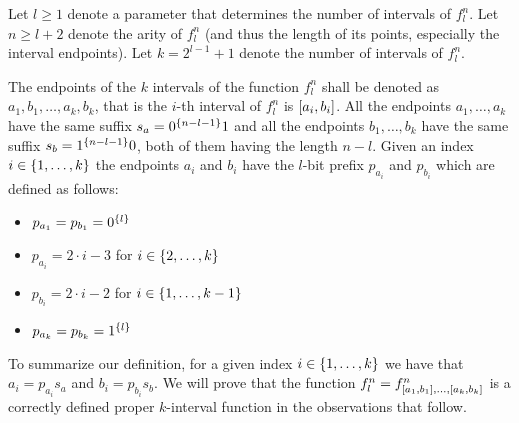 \begin{definition}
\label{def:difficultfn}

Let $l \geq 1$
denote a parameter that determines the number of intervals of $f_l^n$.
Let $n \geq l+2$
denote the arity of $f_l^n$
(and thus the length of its points,
especially the interval endpoints).
Let $k = 2^{l-1} + 1$ denote the number of intervals of $f_l^n$.


The endpoints of the $k$ intervals
of the function $f^n_l$ shall be denoted as
$a_1, b_1, \ldots, a_k, b_k$,
that is the $i$-th interval of $f^n_l$
is $[a_i, b_i]$.
All the endpoints $a_1, \ldots, a_k$
have the same suffix $s_a = 0^{\{n-l-1\}} 1$
and all the endpoints $b_1, \ldots, b_k$
have the same suffix $s_b = 1^{\{n-l-1\}} 0$,
both of them having the length $n-l$.
Given an index $i \in \{1, \ldots, k\}$
the endpoints $a_i$ and $b_i$ have the $l$-bit prefix
$p_{a_i}$ and $p_{b_i}$ which are defined as follows:
\begin{itemize}
\item $p_{a_1} = p_{b_1} = 0^{\{l\}}$
\item $p_{a_i} = 2 \cdot i - 3$ for $i \in \{2, \ldots, k\}$
\item $p_{b_i} = 2 \cdot i - 2$ for $i \in \{1, \ldots, k-1\}$
\item $p_{a_k} = p_{b_k} = 1^{\{l\}}$
\end{itemize}

To summarize our definition,
for a given index $i \in \{1, \ldots, k\}$
we have that
$a_i = p_{a_i} s_a$ and $b_i = p_{b_i} s_b$.
We will prove that the function $f_l^n = f^{n}_{[a_1, b_1], \ldots, [a_{k}, b_{k}]}$
is a correctly defined proper $k$-interval function
in the observations that follow.

\end{definition}

